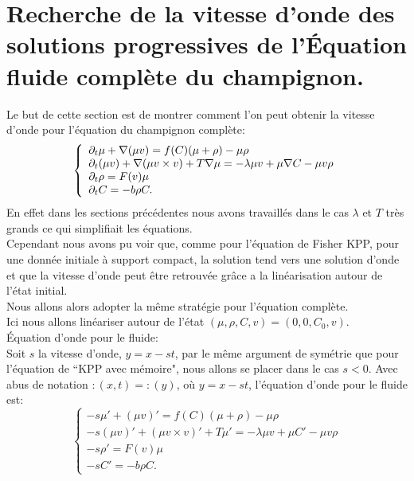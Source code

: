 \documentclass[11pt]{article}
\begin{document}
\fi
\section{Recherche de la vitesse d'onde des solutions progressives de l'Équation fluide complète du champignon.}
Le but de cette section est de montrer comment l'on peut obtenir la vitesse d’onde pour l’équation du champignon complète:  
\begin{equation}  \left\{
                \begin{array}{ll}
                \partial_t\mu + \nabla(\mu v) = f(C)(\mu + \rho) -\mu\rho \\
                   \partial_t(\mu v)+\nabla(\mu v\times v) +T\nabla\mu=-\lambda\mu v+\mu\nabla C-\mu v \rho \\
                 \partial_t\rho=  F(v) \mu \\
                  \partial_t C = -b\rho C.
                \end{array}
              \right.
\end{equation} 
En effet dans les sections précédentes nous avons travaillés dans le cas $\lambda$ et $T$ très grands ce qui simplifiait les équations.\\
Cependant nous avons pu voir que, comme pour l’équation de Fisher KPP, pour une donnée initiale à support compact, la solution tend vers une solution d'onde et que la vitesse d'onde peut être retrouvée grâce a la linéarisation autour de l'état initial.\\
Nous allons alors adopter la même stratégie pour l’équation complète.\\
Ici nous allons linéariser autour de l’état $(\mu,\rho,C,v) = (0,0,C_0,v)$.\\
Équation d'onde pour le fluide:\\
Soit $s$ la vitesse d'onde, $y=x-st$, par le même argument de symétrie que pour l’équation de  ``KPP avec mémoire", nous allons se placer dans le cas $s<0$. Avec abus de notation $ :(x,t) = :(y)$, où $y=x-st$, l’équation d'onde pour le fluide est:
\begin{equation}\label{eq:FWS_BDNG}  \left\{
                \begin{array}{ll}
                -s\mu' + (\mu v)' = f(C)(\mu + \rho) -\mu\rho \\
                   -s (\mu v)'+(\mu v\times v)' +T\mu'=-\lambda\mu v+\mu C'-\mu v \rho \\
                 -s \rho '=  F(v) \mu \\
                  -sC' = -b\rho C.
                \end{array}
              \right.
\end{equation} 
\end{document}
